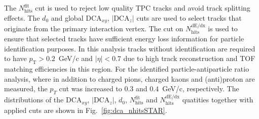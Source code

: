The $N_{\textrm{hits}}^{\textrm{fit}}$ cut is used to reject low quality TPC tracks and avoid track splitting effects. The $d_0$ and global $\textrm{DCA}_{xy}$,  $|\textrm{DCA}_{z}|$ cuts are used to select tracks that originate from the primary interaction vertex. The cut on $N_{\textrm{hits}}^{\textrm{dE/dx}}$ is used to ensure that selected tracks have sufficient energy loss information
for particle identification purposes. In this analysis tracks without identification are required to have $p_\textrm{T} > 0.2$~GeV/c and $|\eta| < 0.7$ due to high track reconstruction and TOF matching efficiencies in this region. For the identified particle-antiparticle ratio analysis, where in addition to charged pions, charged kaons and (anti)proton  are measured, the $p_T$ cut was increased  to $0.3$ and $0.4$~GeV/c, respectively. 
The distributions of the $\textrm{DCA}_{xy}$, $|\textrm{DCA}_{z}|$, $d_0$, $N_{\textrm{hits}}^{\textrm{fit}}$ and $N_{\textrm{hits}}^{\textrm{dE/dx}}$ quatities together with applied cuts are shown in Fig.~\ref{fig:dca_nhitsSTAR}. 



